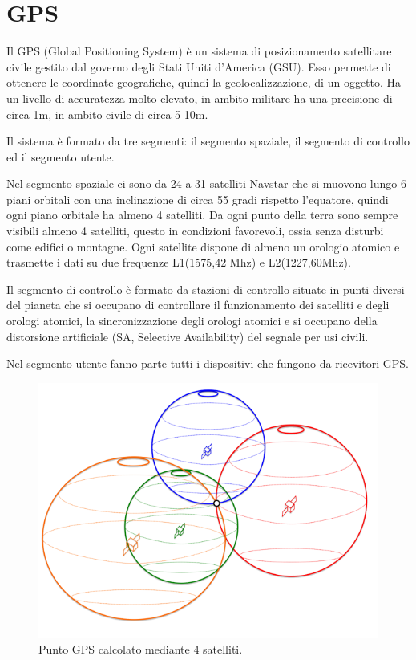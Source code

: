 \documentclass[12pt,a4paper,openright,twoside]{report}
\begin{document}
\section{GPS}
Il GPS (Global Positioning System) è un sistema di posizionamento satellitare civile gestito dal governo degli Stati Uniti d'America (GSU). Esso permette di ottenere le coordinate geografiche, quindi la geolocalizzazione, di un oggetto.
Ha un livello di accuratezza molto elevato, in ambito militare ha una precisione di circa 1m, in ambito civile di circa 5-10m.

Il sistema è formato da tre segmenti: il segmento spaziale, il segmento di controllo ed il segmento utente. \cite{K15}


Nel segmento spaziale ci sono da 24 a 31 satelliti Navstar che si muovono lungo 6 piani orbitali con una inclinazione di circa 55 gradi rispetto l'equatore, quindi ogni piano orbitale ha almeno 4 satelliti. Da ogni punto della terra sono sempre visibili almeno 4 satelliti, questo in condizioni favorevoli, ossia senza disturbi come edifici o montagne. Ogni satellite dispone di almeno un orologio atomico e trasmette i dati su due frequenze L1(1575,42 Mhz) e L2(1227,60Mhz).


Il segmento di controllo è formato da stazioni di controllo situate in punti diversi del pianeta che si occupano di controllare il funzionamento dei satelliti e degli orologi atomici, la sincronizzazione degli orologi atomici e si occupano della distorsione artificiale (SA, Selective Availability) del segnale per usi civili.


Nel segmento utente fanno parte tutti i dispositivi che fungono da ricevitori GPS.
\begin{figure}[h!]
\centering 
\includegraphics[scale=0.6]{fig8} 
\caption{Punto GPS calcolato mediante 4 satelliti. \cite{K16}} 
\end{figure}
\end{document}
